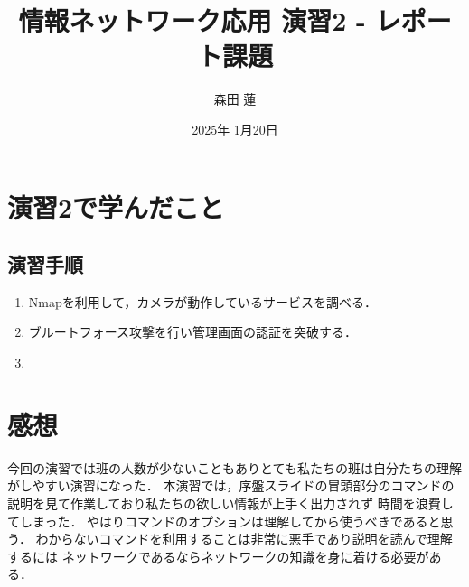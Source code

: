 \documentclass{jlreq}
\title{情報ネットワーク応用 演習2 - レポート課題}
\author{森田 蓮}
\date{2025年 1月20日}
\begin{document}
\maketitle

\section{演習2で学んだこと}
\subsection{演習手順}
\begin{enumerate}
    \item Nmapを利用して，カメラが動作しているサービスを調べる．
    \item ブルートフォース攻撃を行い管理画面の認証を突破する．
    \item 
\end{enumerate}



\section{感想}
今回の演習では班の人数が少ないこともありとても私たちの班は自分たちの理解がしやすい演習になった．
本演習では，序盤スライドの冒頭部分のコマンドの説明を見て作業しており私たちの欲しい情報が上手く出力されず
時間を浪費してしまった．
やはりコマンドのオプションは理解してから使うべきであると思う．
わからないコマンドを利用することは非常に悪手であり説明を読んで理解するには
ネットワークであるならネットワークの知識を身に着ける必要がある．
\end{document}
